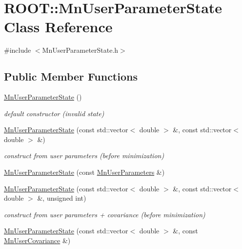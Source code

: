 \hypertarget{classROOT_1_1Minuit2_1_1MnUserParameterState}{}\section{R\+O\+OT\+:\+:Mn\+User\+Parameter\+State Class Reference}
\label{classROOT_1_1Minuit2_1_1MnUserParameterState}


{\ttfamily \#include $<$Mn\+User\+Parameter\+State.\+h$>$}

\subsection*{Public Member Functions}
\begin{DoxyCompactItemize}
\item 
\mbox{\hyperlink{classROOT_1_1Minuit2_1_1MnUserParameterState_aa327732c14a8771b3ae0cb5a67bba9f7}{Mn\+User\+Parameter\+State}} ()
\begin{DoxyCompactList}\small\item\em default constructor (invalid state) \end{DoxyCompactList}\item 
\mbox{\hyperlink{classROOT_1_1Minuit2_1_1MnUserParameterState_a75f83d5752afc69f1e55838f8446880a}{Mn\+User\+Parameter\+State}} (const std\+::vector$<$ double $>$ \&, const std\+::vector$<$ double $>$ \&)
\begin{DoxyCompactList}\small\item\em construct from user parameters (before minimization) \end{DoxyCompactList}\item 
\mbox{\hyperlink{classROOT_1_1Minuit2_1_1MnUserParameterState_aa4a32c2e51a89c2feca7a376972f1ff5}{Mn\+User\+Parameter\+State}} (const \mbox{\hyperlink{classROOT_1_1Minuit2_1_1MnUserParameters}{Mn\+User\+Parameters}} \&)
\item 
\mbox{\hyperlink{classROOT_1_1Minuit2_1_1MnUserParameterState_a146a0e2f845431830d795b919bb8f594}{Mn\+User\+Parameter\+State}} (const std\+::vector$<$ double $>$ \&, const std\+::vector$<$ double $>$ \&, unsigned int)
\begin{DoxyCompactList}\small\item\em construct from user parameters + covariance (before minimization) \end{DoxyCompactList}\item 
\mbox{\hyperlink{classROOT_1_1Minuit2_1_1MnUserParameterState_adc49551ffd44db2eb6e2decfdafb2625}{Mn\+User\+Parameter\+State}} (const std\+::vector$<$ double $>$ \&, const \mbox{\hyperlink{classROOT_1_1Minuit2_1_1MnUserCovariance}{Mn\+User\+Covariance}} \&)

\end{DoxyCompactItemize}
